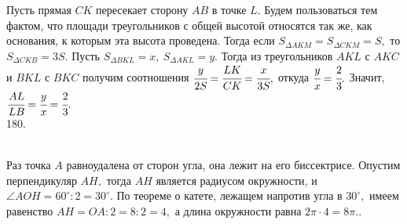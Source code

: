 \documentclass[12pt]{article}
\begin{document}
Пусть прямая $CK$ пересекает сторону $AB$ в точке $L.$ Будем пользоваться тем фактом, что площади треугольников с общей высотой относятся так же, как основания, к которым эта высота проведена. Тогда если $S_{\Delta AKM}=S_{\Delta CKM}=S,$ то $S_{\Delta CKB}=3S.$ Пусть $S_{\Delta BKL}=x,\ S_{\Delta AKL}=y.$ Тогда из треугольников $AKL$ с $AKC$ и $BKL$ с $BKC$ получим соотношения $\cfrac{y}{2S}=\cfrac{LK}{CK}=\cfrac{x}{3S},$ откуда $\cfrac{y}{x}=\cfrac{2}{3}.$ Значит, $\cfrac{AL}{LB}=\cfrac{y}{x}=\cfrac{2}{3}.$\\
180. \begin{figure}[ht!]
\end{figure}\\
Раз точка $A$ равноудалена от сторон угла, она лежит на его биссектрисе. Опустим перпендикуляр $AH,$ тогда $AH$ является радиусом окружности, и $\angle AOH=60^\circ:2=30^\circ.$ По теореме о катете, лежащем напротив угла в $30^\circ,$ имеем равенство $AH=OA:2=8:2=4,$ а длина окружности равна $2\pi\cdot4=8\pi.$\newpage{}. \begin{figure}[ht!]
\end{figure}\\
\end{document}
